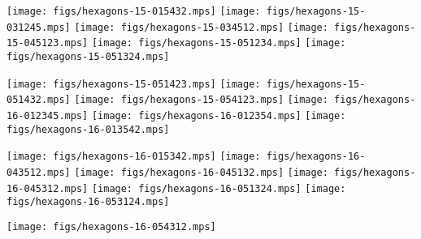 \noindent
\texttt{[image: figs/hexagons-15-015432.mps]}
\texttt{[image: figs/hexagons-15-031245.mps]}
\texttt{[image: figs/hexagons-15-034512.mps]}
\texttt{[image: figs/hexagons-15-045123.mps]}
\texttt{[image: figs/hexagons-15-051234.mps]}
\texttt{[image: figs/hexagons-15-051324.mps]}

\noindent
\texttt{[image: figs/hexagons-15-051423.mps]}
\texttt{[image: figs/hexagons-15-051432.mps]}
\texttt{[image: figs/hexagons-15-054123.mps]}
\texttt{[image: figs/hexagons-16-012345.mps]}
\texttt{[image: figs/hexagons-16-012354.mps]}
\texttt{[image: figs/hexagons-16-013542.mps]}

\noindent
\texttt{[image: figs/hexagons-16-015342.mps]}
\texttt{[image: figs/hexagons-16-043512.mps]}
\texttt{[image: figs/hexagons-16-045132.mps]}
\texttt{[image: figs/hexagons-16-045312.mps]}
\texttt{[image: figs/hexagons-16-051324.mps]}
\texttt{[image: figs/hexagons-16-053124.mps]}

\noindent
\texttt{[image: figs/hexagons-16-054312.mps]}